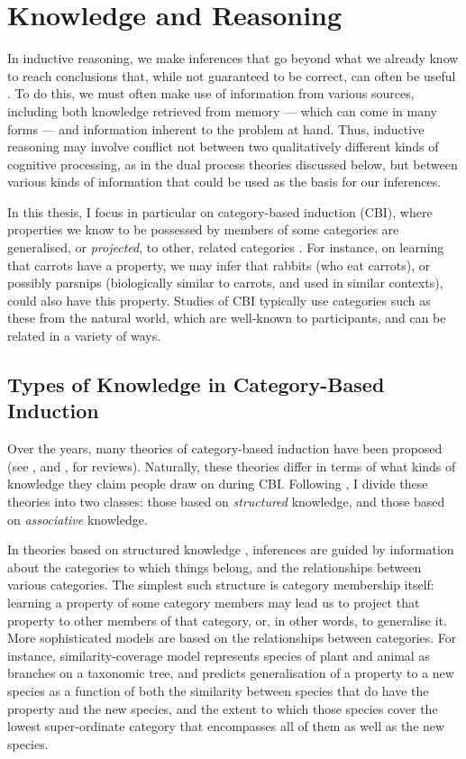 
\section{Knowledge and Reasoning}
\label{sec:chapter1-knowledge}

In inductive reasoning,
we make inferences that go beyond what we already know
to reach conclusions that, while not guaranteed to be correct,
can often be useful \citep{Bruner1973}.
To do this, we must often make use of information from various sources,
including both knowledge retrieved from memory
--- which can come in many forms ---
and information inherent to the problem at hand.
Thus, inductive reasoning may involve conflict
not between two qualitatively different kinds of cognitive processing,
as in the dual process theories discussed below,
but between various kinds of information
that could be used as the basis for our inferences.

In this thesis, I focus in particular on category-based induction (CBI),
where properties we know to be possessed by members of some categories
are generalised, or \emph{projected}, to other, related categories \citep{Rips1975}.
For instance, on learning that carrots have a property,
we may infer that rabbits (who eat carrots),
or possibly parsnips (biologically similar to carrots, and used in similar contexts),
could also have this property.
Studies of CBI typically use categories such as these from the natural world,
which are well-known to participants, and can be related in a variety of ways.


\subsection{Types of Knowledge in Category-Based Induction}
\label{subsec:chapter1-knowledge-types}

Over the years, many theories of category-based induction have been proposed
(see \citealp{Feeney2007}, and \citealp{Hayes2010}, for reviews).
Naturally, these theories differ in terms of
what kinds of knowledge they claim people draw on during CBI.
Following \citet{Bright2014a}, I divide these theories into two classes:
those based on \emph{structured} knowledge,
and those based on \emph{associative} knowledge.

In theories based on structured knowledge
\citep{Osherson1990, Kemp2009, Griffiths2009, Kemp2003, Shafto2008, Tenenbaum2006},
inferences are guided by information about
the categories to which things belong,
and the relationships between various categories.
The simplest such structure is category membership itself:
learning a property of some category members
may lead us to project that property to other members of that category,
or, in other words, to generalise it.
More sophisticated models are based on the relationships
between categories.
For instance,  similarity-coverage model
represents species of plant and animal as branches on a taxonomic tree,
and predicts generalisation of a property to a new species
as a function of both the similarity between
species that do have the property and the new species,
and the extent to which those species cover the lowest super-ordinate category
that encompasses all of them as well as the new species.

